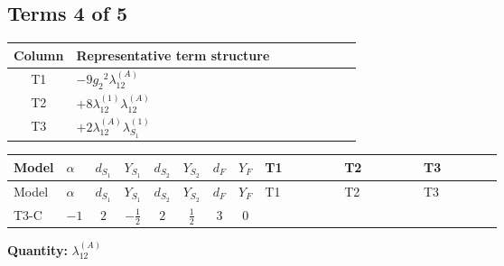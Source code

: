 \documentclass[8pt]{article}
\begin{document}
\begin{landscape}
\subsection*{Terms 4 of 5}
\begin{center}
\begin{tabular}{@{}c >{\raggedright\arraybackslash}p{0.82\linewidth}@{}}
\toprule
Column & Representative term structure \\
\midrule
T1 & \(\displaystyle -9 {g_2}^2 {\lambda_{12}^{(A)}}\) \\
\midrule
T2 & \(\displaystyle +8 {\lambda_{12}^{(1)}} {\lambda_{12}^{(A)}}\) \\
\midrule
T3 & \(\displaystyle +2 {\lambda_{12}^{(A)}} {\lambda_{S_1}^{(1)}}\) \\
\midrule
\bottomrule
\end{tabular}
\end{center}
\smallskip
\tiny
\begin{longtable}{@{}llcccccc >{\raggedright\arraybackslash}p{0.21\linewidth} >{\raggedright\arraybackslash}p{0.21\linewidth} >{\raggedright\arraybackslash}p{0.21\linewidth}@{}}
\toprule
Model & $\alpha$ & $d_{S_1}$ & $Y_{S_1}$ & $d_{S_2}$ & $Y_{S_2}$ & $d_F$ & $Y_F$ & T1 & T2 & T3 \\
\midrule
\endfirsthead
\toprule
Model & $\alpha$ & $d_{S_1}$ & $Y_{S_1}$ & $d_{S_2}$ & $Y_{S_2}$ & $d_F$ & $Y_F$ & T1 & T2 & T3 \\
\midrule
\endhead
T3-C & $-1$ & $2$ & $-\frac{1}{2}$ & $2$ & $\frac{1}{2}$ & $3$ & $0$ & \scriptsize\adjustbox{max width=\linewidth}{$\begin{gathered} -9 {g_2}^2 {\lambda_{12}^{(A)}}\end{gathered}$} & \scriptsize\adjustbox{max width=\linewidth}{$\begin{gathered} +8 {\lambda_{12}^{(1)}} {\lambda_{12}^{(A)}}\end{gathered}$} & \scriptsize\adjustbox{max width=\linewidth}{$\begin{gathered} +2 {\lambda_{12}^{(A)}} {\lambda_{S_1}^{(1)}}\end{gathered}$} \\
\midrule
\bottomrule
\end{longtable}
\clearpage
\noindent\textbf{Quantity: }$\lambda_{12}^{(A)}$\par\smallskip

\end{landscape}
\end{document}
